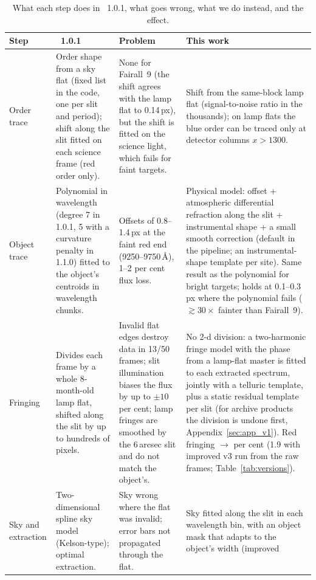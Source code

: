 \begin{table}[!htbp]
\small
\caption{What each step does in \banzai{}~1.0.1, what goes wrong, what we do instead, and the effect.}
\label{tab:stages}
\begin{tabularx}{\textwidth}{@{}>{\raggedright\arraybackslash}p{2.0cm}*{3}{>{\raggedright\arraybackslash}X}@{}}
\toprule
Step & \banzai{}~1.0.1 & Problem & This work \\
\midrule
Order trace &
Order shape from a sky flat (fixed list in the code, one per slit and period); shift along the slit fitted on each
science frame (red order only). &
None for Fairall~9 (the shift agrees with the lamp flat to 0.14\,px), but the shift is fitted on the science light,
which fails for faint targets. &
Shift from the same-block lamp flat (signal-to-noise ratio in the thousands); on lamp flats the blue order can be
traced only at detector columns $x>1300$. \\
Object trace &
Polynomial in wavelength (degree 7 in 1.0.1, 5 with a curvature penalty in 1.1.0) fitted to the object's centroids
in wavelength chunks. &
Offsets of 0.8--1.4\,px at the faint red end (9250--9750\,\AA), 1--2 per cent flux loss. &
Physical model: offset + atmospheric differential refraction along the slit + instrumental shape + a small smooth
correction (default in the pipeline; an instrumental-shape template per site). Same result as the polynomial for
bright targets; holds at 0.1--0.3\,px where the polynomial fails ($\gtrsim30\times$ fainter than Fairall~9). \\
Fringing &
Divides each frame by a whole 8-month-old lamp flat, shifted along the slit by up to hundreds of pixels. &
Invalid flat edges destroy data in 13/50 frames; slit illumination biases the flux by up to $\pm10$ per cent; lamp
fringes are smoothed by the 6\,arcsec slit and do not match the object's. &
No 2-d division: a two-harmonic fringe model with the phase from a lamp-flat master is fitted to each extracted
spectrum, jointly with a telluric template, plus a static residual template per slit (for archive products the
division is undone first, Appendix~\ref{sec:app_v1}). Red fringing \FrOld{}$\rightarrow$\FrNewOpt{} per cent
(1.9 with improved v3 run from the raw frames; Table~\ref{tab:versions}). \\
Sky and extraction &
Two-dimensional spline sky model (Kelson-type); optimal extraction. &
Sky wrong where the flat was invalid; error bars not propagated through the flat. &
Sky fitted along the slit in each wavelength bin, with an object mask that adapts to the object's width (improved

\end{tabularx}
\end{table}
